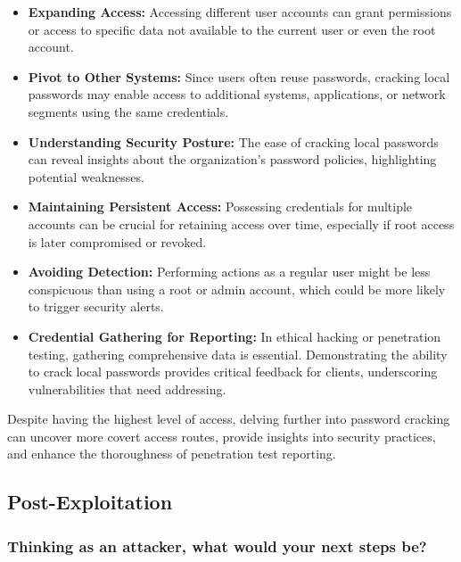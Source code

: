 \begin{itemize}
      \item \textbf{Expanding Access:}
            Accessing different user accounts can grant permissions or access to specific data not available to the current user or even the root account.

      \item \textbf{Pivot to Other Systems:}
            Since users often reuse passwords, cracking local passwords may enable access to additional systems, applications, or network segments using the same credentials.

      \item \textbf{Understanding Security Posture:}
            The ease of cracking local passwords can reveal insights about the organization's password policies, highlighting potential weaknesses.

      \item \textbf{Maintaining Persistent Access:}
            Possessing credentials for multiple accounts can be crucial for retaining access over time, especially if root access is later compromised or revoked.

      \item \textbf{Avoiding Detection:}
            Performing actions as a regular user might be less conspicuous than using a root or admin account, which could be more likely to trigger security alerts.

      \item \textbf{Credential Gathering for Reporting:}
            In ethical hacking or penetration testing, gathering comprehensive data is essential. Demonstrating the ability to crack local passwords provides critical feedback for clients, underscoring vulnerabilities that need addressing.
\end{itemize}

Despite having the highest level of access, delving further into password cracking can uncover more covert access routes, provide insights into security practices, and enhance the thoroughness of penetration test reporting.




\subsection{Post-Exploitation}

\subsubsection{Thinking as an attacker, what would your next steps be?}


